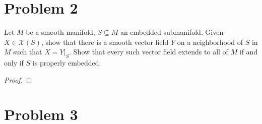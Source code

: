 \documentclass[fontsize=11pt]{scrartcl} %
\numberwithin{equation}{section} %
\numberwithin{figure}{section} %
\numberwithin{table}{section} %
\begin{document}
\section*{Problem 2} %
Let $M$ be a smooth manifold, $S\subseteq M$ an embedded submanifold. Given
$X\in\mathcal{X}(S)$, show that there is a smooth vector field $Y$ on a
neighborhood of $S$ in $M$ such that $X=Y|_S$. Show that every such vector field
extends to all of $M$ if and only if $S$ is properly embedded.
\\
\begin{proof}
\end{proof}

\section*{Problem 3} %
\end{document}
